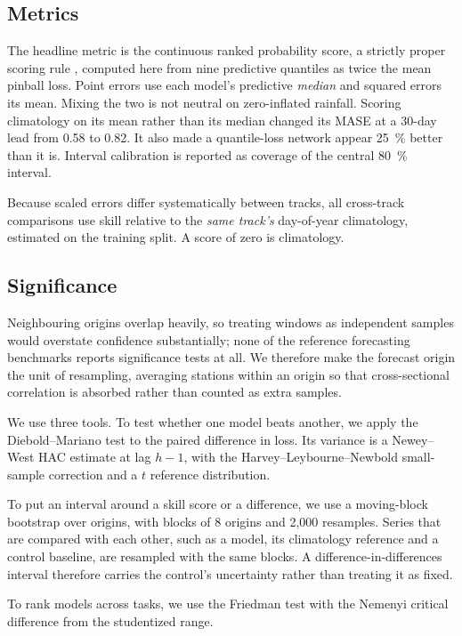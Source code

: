 \subsection{Metrics}

The headline metric is the continuous ranked probability score, a strictly proper scoring rule
\citep{gneiting2007scoring}, computed here from nine predictive quantiles as twice the mean pinball loss. Point errors use each model's predictive \emph{median} and squared errors its mean.
Mixing the two is not neutral on zero-inflated rainfall. Scoring climatology on its mean rather than its median
changed its MASE at a 30-day lead from 0.58 to 0.82. It also made a quantile-loss network appear
\SI{25}{\percent} better than it is. Interval calibration is reported as coverage of the central \SI{80}{\percent} interval.

Because scaled errors differ systematically between tracks, all cross-track comparisons use skill relative to the
\emph{same track's} day-of-year climatology, estimated on the training split. A score of zero is climatology.

\subsection{Significance}

Neighbouring origins overlap heavily, so treating windows as independent samples would overstate confidence
substantially; none of the reference forecasting benchmarks reports significance tests at all. We therefore make
the forecast origin the unit of resampling, averaging stations within an origin so that cross-sectional
correlation is absorbed rather than counted as extra samples.

We use three tools. To test whether one model beats another, we apply the Diebold--Mariano test to the paired
difference in loss. Its variance is a Newey--West HAC estimate at lag $h-1$, with the Harvey--Leybourne--Newbold
small-sample correction and a $t$ reference distribution.

To put an interval around a skill score or a difference, we use a moving-block bootstrap over origins, with blocks
of 8 origins and 2{,}000 resamples. Series that are compared with each other, such as a model, its climatology
reference and a control baseline, are resampled with the same blocks. A difference-in-differences interval
therefore carries the control's uncertainty rather than treating it as fixed.

To rank models across tasks, we use the Friedman test with the Nemenyi critical difference from the studentized
range.

